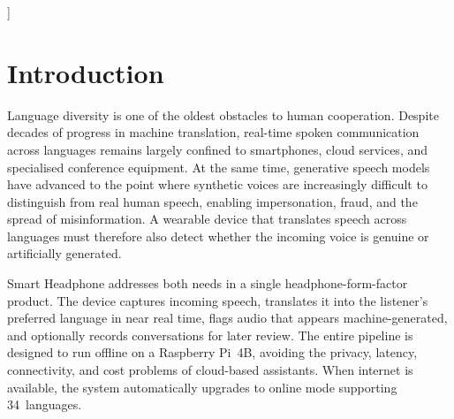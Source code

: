 \documentclass[10pt,twocolumn]{article}
\begin{document}
{\begin{@twocolumnfalse}
\begin{mdframed}[linecolor=sblue,linewidth=1pt,
                   backgroundcolor=white,
                   innerleftmargin=8pt,innerrightmargin=8pt,
                   innertopmargin=6pt,innerbottommargin=6pt]
    \medskip
  \end{mdframed}
  \vspace{6mm}
\end{@twocolumnfalse}
}]

\section{Introduction}

Language diversity is one of the oldest obstacles to human cooperation.
Despite decades of progress in machine translation, real-time spoken communication
across languages remains largely confined to smartphones, cloud services, and
specialised conference equipment. At the same time, generative speech models have
advanced to the point where synthetic voices are increasingly difficult to
distinguish from real human speech, enabling impersonation, fraud, and the spread
of misinformation. A wearable device that translates speech across languages must
therefore also detect whether the incoming voice is genuine or artificially generated.

Smart Headphone addresses both needs in a single headphone-form-factor product.
The device captures incoming speech, translates it into the listener's preferred
language in near real time, flags audio that appears machine-generated, and
optionally records conversations for later review. The entire pipeline is designed
to run offline on a Raspberry Pi~4B, avoiding the privacy, latency, connectivity,
and cost problems of cloud-based assistants. When internet is available, the system
automatically upgrades to online mode supporting 34~languages.
\end{document}
